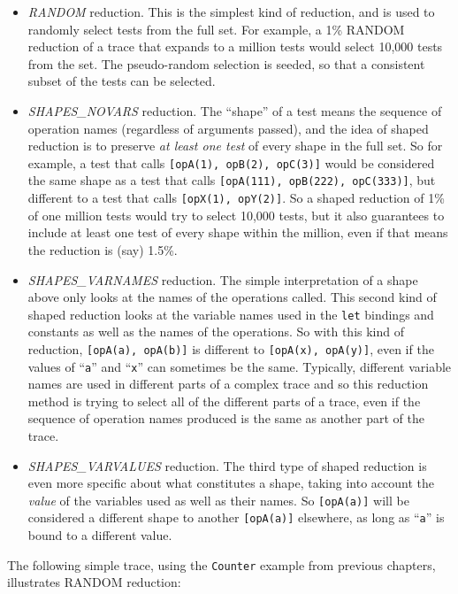 \documentclass{overturerepchap}
\begin{document}
\begin{itemize}
\item \emph{RANDOM} reduction. This is the simplest kind of reduction, and is
used to randomly select tests from the full set. For example, a 1\% RANDOM 
reduction of a trace that expands to a million tests would select 10,000 tests
from the set. The pseudo-random selection is seeded, so that a consistent subset
of the tests can be selected.
\item \emph{SHAPES\_NOVARS} reduction. The ``shape'' of a test means the sequence
of operation names (regardless of arguments passed), and the idea of shaped
reduction is to preserve \emph{at least one test} of every shape in the full
set. So for example, a test that calls \texttt{[opA(1), opB(2), opC(3)]} would
be considered the same shape as a test that calls \texttt{[opA(111), opB(222),
opC(333)]}, but different to a test that calls \texttt{[opX(1), opY(2)]}. So a
shaped reduction of 1\% of one million tests would try to select 10,000 tests,
but it also guarantees to include at least one test of every shape within the
million, even if that means the reduction is (say) 1.5\%.
\item \emph{SHAPES\_VARNAMES} reduction. The simple interpretation of a
shape above only looks at the names of the operations called. This second kind
of shaped reduction looks at the variable names used in the \texttt{let}
bindings and constants as well as the names of the operations. So with this kind
of reduction, \texttt{[opA(a), opA(b)]} is different to \texttt{[opA(x),
opA(y)]}, even if the values of ``\texttt{a}'' and ``\texttt{x}'' can sometimes be the same.
Typically, different variable names are used in different parts of a complex
trace and so this reduction method is trying to select all of the different
parts of a trace, even if the sequence of operation names produced is the same
as another part of the trace.
\item \emph{SHAPES\_VARVALUES} reduction. The third type of shaped reduction is
even more specific about what constitutes a shape, taking into account the
\emph{value} of the variables used as well as their names. So \texttt{[opA(a)]}
will be considered a different shape to another \texttt{[opA(a)]} elsewhere, as
long as ``\texttt{a}'' is bound to a different value.
\end{itemize}

The following simple trace, using the \texttt{Counter} example from previous
chapters, illustrates RANDOM reduction:
\end{document}
